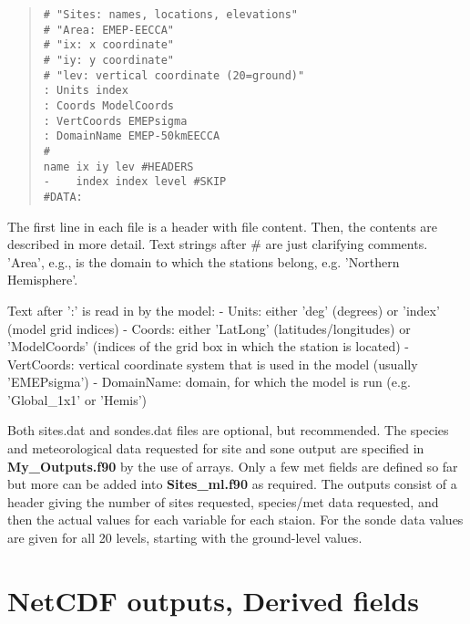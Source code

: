 \begin{small}
\begin{quote}
\begin{verbatim}
# "Sites: names, locations, elevations"
# "Area: EMEP-EECCA"
# "ix: x coordinate"
# "iy: y coordinate"
# "lev: vertical coordinate (20=ground)"
: Units index
: Coords ModelCoords
: VertCoords EMEPsigma
: DomainName EMEP-50kmEECCA
#
name ix iy lev #HEADERS
-    index index level #SKIP
#DATA:

\end{verbatim}

\end{quote}
\end{small}

The first line in each file is a header with file content.
Then, the contents are described in more detail. Text strings after
\# are just clarifying comments. 'Area', e.g., is the domain to which
the stations belong, e.g. 'Northern Hemisphere'.

Text after ':' is read in by the model:\newline
- Units: either 'deg' (degrees) or 'index' (model grid indices)\newline
- Coords: either 'LatLong' (latitudes/longitudes) or 'ModelCoords'
(indices of the grid box in which the station is located)\newline
- VertCoords: vertical coordinate system that is used in the model (usually
'EMEPsigma')\newline
- DomainName: domain, for which the model is run (e.g. 'Global\_1x1' or 'Hemis')\newline


Both sites.dat and sondes.dat files are optional, but recommended. 
The species and meteorological data requested for site and sone output
 are specified in {\bf My\_Outputs.f90} by the use of arrays. Only a 
few met fields are defined so far but more can be added into 
{\bf Sites\_ml.f90} as required. The outputs consist
of a header giving the number of sites requested, species/met data requested, and
then the actual values for each variable for each staion. For the sonde data
values are given for all 20 levels, starting with the ground-level values.




\section{NetCDF outputs, Derived fields}


